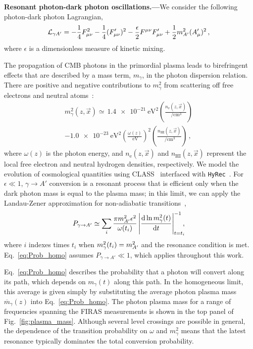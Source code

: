 \documentclass[prd,aps,10pt,nofootinbib,twocolumn,superscriptaddress,preprintnumbers,balancelastpage,longbibliography]{revtex4-1}
\begin{document}
\noindent
{\bf Resonant photon-dark photon oscillations.---}We consider the following photon-dark photon Lagrangian, 
\begin{equation}
\mathcal{L}_{\gamma A'}=-\frac{1}{4}F_{\mu \nu}^{2}-\frac{1}{4}(F_{\mu \nu}^{\prime})^{2}-\frac{\epsilon}{2} F^{\mu \nu} F_{\mu \nu}^{\prime}+\frac{1}{2} m_{A^\prime}^{2}(A_{\mu}^{\prime})^{2} \, ,
\end{equation}
where  $\epsilon$ is a dimensionless measure of kinetic mixing.

The propagation of CMB photons in the primordial plasma leads to birefringent effects that are described by a mass term, $m_\gamma$, in the photon dispersion relation.  There are positive and negative contributions to $m_{\gamma}^{2}$ from scattering off free electrons and neutral atoms~\cite{Kunze:2015noa,Mirizzi:2009iz}:
\begin{multline}
    {m_{\gamma}^2(z, \vec{x})} \simeq \, \SI{1.4e-21}{\eV\squared} \left(\frac{n_\mathrm{e}(z, \vec{x})}{\SI{}{\per\centi\meter\cubed}}\right)  \label{eq:m_gamma_sq}  \\
      - \SI{1.0e-23}{\eV\squared} \left( \frac{\omega(z)}{\SI{}{\eV}} \right)^2 \left(\frac{n_{\mathrm{HI}}(z, \vec{x})}{\SI{}{\per\centi\meter\cubed}}\right)  \,, 
\end{multline}
where $\omega(z)$ is the photon energy, and  $n_\mathrm{e}(z, \vec{x})$ and $n_\mathrm{HI}(z, \vec{x})$ represent the local free electron and neutral hydrogen densities, respectively. We model the evolution of cosmological quantities using CLASS~\cite{Blas:2011rf} interfaced with \texttt{HyRec}~\cite{AliHaimoud:2010dx}. For $\epsilon \ll 1$, $\gamma \to A'$ conversion is a resonant process that is efficient only when the dark photon mass is equal to the plasma mass; in this limit, we can apply the Landau-Zener approximation for non-adiabatic transitions~\cite{Mirizzi:2009iz},
%
\begin{equation}
    P_{\gamma \rightarrow A'} \simeq \sum_i \frac{\pi m_{A^\prime}^{2} \epsilon^{2}}{\omega(t_i)}\left|\frac{\mathrm{d}\ln m_{\gamma}^{2}(t)}{\mathrm{d} t}\right|_{t=t_i}^{-1} \!\!\!,
    \label{eq:Prob_homo}
\end{equation}
%
where $i$ indexes times $t_i$ when $m_\gamma^2(t_i) = m_{A^\prime}^2$ and the resonance condition is met.  Eq.~\eqref{eq:Prob_homo} assumes $P_{\gamma \rightarrow A'} \ll 1$, which applies throughout this work.

Eq.~\eqref{eq:Prob_homo} describes the probability that a photon will convert along its path, which depends on $m_\gamma(t)$ along this path.  In the homogeneous limit, this average is given simply by substituting the average photon plasma mass $\overline m_\gamma(z)$ into Eq.~\eqref{eq:Prob_homo}.  The photon plasma mass for a range of frequencies spanning the FIRAS measurements is shown in the top panel of Fig.~\ref{fig:plasma_mass}. Although several level crossings are possible in general, the dependence of the transition probability on $\omega$ and $m_\gamma^2$ means that the latest resonance typically dominates the total conversion probability. 
\end{document}
